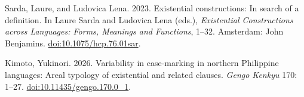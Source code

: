 Sarda, Laure, and Ludovica Lena. 2023.
Existential constructions: In search of a definition.
In Laure Sarda and Ludovica Lena (eds.),
\textit{Existential Constructions across Languages: Forms, Meanings and
Functions}, 1--32.
Amsterdam: John Benjamins.
\href{https://doi.org/10.1075/hcp.76.01sar}{doi:10.1075/hcp.76.01sar}.

Kimoto, Yukinori. 2026.
Variability in case-marking in northern Philippine languages:
Areal typology of existential and related clauses.
\textit{Gengo Kenkyu} 170: 1--27.
\href{https://doi.org/10.11435/gengo.170.0_1}{doi:10.11435/gengo.170.0\_1}.
